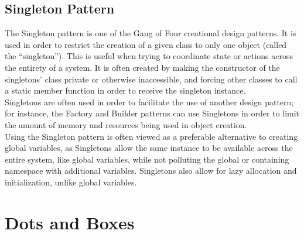 \documentclass{article}
\begin{document}
    \subsection{Singleton Pattern}
    The Singleton pattern is one of the Gang of Four creational design patterns.
    It is used in order to restrict the creation of a given class to only one
    object (called the ``singleton''). This is useful when trying to coordinate
    state or actions across the entirety of a system. It is often created by
    making the constructor of the singletons' class private or otherwise
    inaccessible, and forcing other classes to call a static member function in
    order to receive the singleton instance.\\
    Singletons are often used in order to facilitate the use of another design
    pattern; for instance, the Factory and Builder patterns can use Singletons
    in order to limit the amount of memory and resources being used in object
    creation.\\
    Using the Singleton pattern is often viewed as a preferable alternative to
    creating global variables, as Singletons allow the same instance to be
    available across the entire system, like global variables, while not
    polluting the global or containing namespace with additional variables.
    Singletons also allow for lazy allocation and initialization, unlike global
    variables.
    \newpage
    \section{Dots and Boxes}
\end{document}
